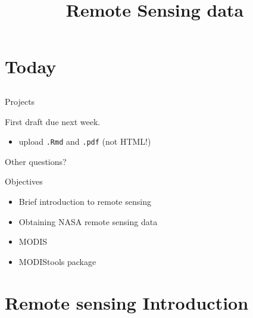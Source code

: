 \documentclass[ignorenonframetext,]{beamer}
\title{Remote Sensing data}
\date{}
\begin{document}
\frame{\titlepage}

\section{Today}\label{today}

\subsection{}\label{section}

\begin{frame}{Projects}

First draft due next week.

\begin{itemize}
\itemsep1pt\parskip0pt
\item
  upload \texttt{.Rmd} and \texttt{.pdf} (not HTML!)
\end{itemize}

Other questions?

\end{frame}

\begin{frame}{Objectives}

\begin{itemize}
\itemsep1pt\parskip0pt
\item
  Brief introduction to remote sensing
\item
  Obtaining NASA remote sensing data
\item
  MODIS
\item
  MODIStools package
\end{itemize}

\end{frame}

\section{Remote sensing Introduction}\label{remote-sensing-introduction}

\subsection{}\label{section-1}
\end{document}
